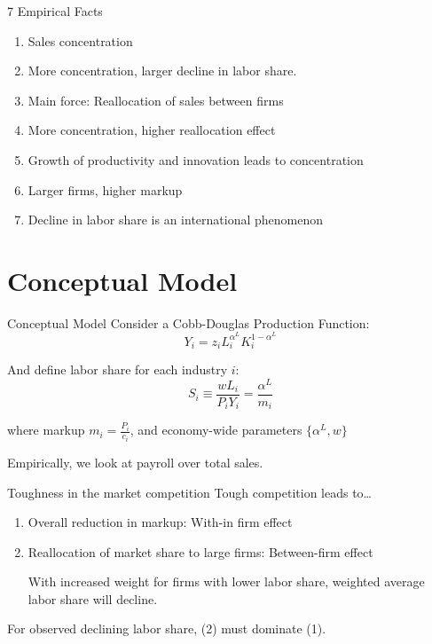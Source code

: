 \documentclass[
  10pt,
  ignorenonframetext,
  aspectratio=43,
]{beamer}
\begin{document}
\begin{frame}{7 Empirical Facts}
\protect\hypertarget{empirical-facts}{}
\begin{enumerate}
\item
  Sales concentration
\item
  More concentration, larger decline in labor share.
\item
  Main force: Reallocation of sales between firms
\item
  More concentration, higher reallocation effect
\item
  Growth of productivity and innovation leads to concentration
\item
  Larger firms, higher markup
\item
  Decline in labor share is an international phenomenon
\end{enumerate}
\end{frame}

\hypertarget{conceptual-model}{%
\section{Conceptual Model}\label{conceptual-model}}

\begin{frame}{Conceptual Model}
Consider a Cobb-Douglas Production Function: \[
Y_i = z_i L_i^{\alpha^L} K_i^{1 - \alpha^L}
\]

And define labor share for each industry \(i\): \[
S_i \equiv \frac{w L_i}{P_i Y_i} = \frac{\alpha^L}{m_i}
\]

where markup \(m_i = \frac{P_i}{c_i}\), and economy-wide parameters
\(\{\alpha^L, w\}\)

Empirically, we look at payroll over total sales.
\end{frame}

\begin{frame}{Toughness in the market competition}
\protect\hypertarget{toughness-in-the-market-competition}{}
Tough competition leads to\ldots{}

\begin{enumerate}
\item
  Overall reduction in markup: With-in firm effect
\item
  Reallocation of market share to large firms: Between-firm effect

  With increased weight for firms with lower labor share, weighted
  average labor share will decline.
\end{enumerate}

For observed declining labor share, (2) must dominate (1).
\end{frame}
\end{document}
